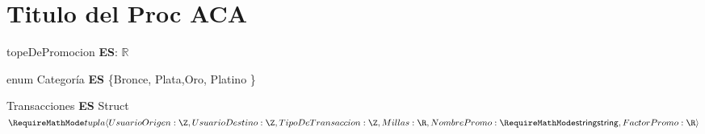 \documentclass[11pt,a4paper]{article}
\newcommand{\Tipo}[1]{\mathsf{#1}}
\begin{document}
\section{Titulo del Proc ACA}

\noindent topeDePromocion \textbf{ES}: $\mathbb{R}$
\vspace{0.5cm}

\noindent enum Categoría \textbf{ES} \{Bronce, Plata,Oro, Platino  \}

\vspace{0.5cm}

\noindent Transacciones \textbf{ES} Struct$\struct{
		UsuarioOrigen: \Tipo{\Z}, \\
		UsuarioDestino: \Tipo{\Z},
		TipoDeTransaccion: \Tipo{\Z},
		Millas: \Tipo{\R}, \\
		NombrePromo: \Tipo{\str},
		FactorPromo: \Tipo{\R}
	}$
\end{document}
